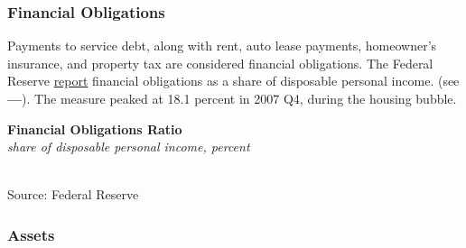 \documentclass{report}
\makeatletter
\newcommand{\tbllink}[1]{\href{https://raw.githubusercontent.com/bdecon/US-chartbook/master/chartbook/data/#1}{\faTable}}
\newcommand*\short[1]{\expandafter\@gobbletwo\number\numexpr#1\relax}
\newcommand{\shdateaxisticks}{
		date coordinates in=x, axis line style={draw=none},
		xmax={2021-06-15},
		max space between ticks=40,	    
		xtick={{1990-01-01}, {1995-01-01}, {2000-01-01}, 
			{2005-01-01}, {2010-01-01}, {2015-01-01}, {2020-01-01}},
		minor xtick={},
		enlarge y limits={0.06}, enlarge x limits={0.01},
		}
\newcommand{\stdline}[4]{\addplot[very thick, no markers, color=#1] 
		table [x=#2, y=#3, col sep=comma] {#4};	}
\newcommand{\rbars}{
		\fill[color=black!10] (axis cs:{1990-07-01},\pgfkeysvalueof{/pgfplots/ymin}) rectangle 
			(axis cs:{1991-03-01}, \pgfkeysvalueof{/pgfplots/ymax});
		\fill[color=black!10] (axis cs:{2007-12-01},\pgfkeysvalueof{/pgfplots/ymin}) rectangle 
			(axis cs:{2009-07-01}, \pgfkeysvalueof{/pgfplots/ymax});
		\fill[color=black!10] (axis cs:{2001-03-01},\pgfkeysvalueof{/pgfplots/ymin}) rectangle 
			(axis cs:{2001-11-01}, \pgfkeysvalueof{/pgfplots/ymax});
		\fill[color=black!10] (axis cs:{2020-02-01},\pgfkeysvalueof{/pgfplots/ymin}) rectangle 
			(axis cs:{2021-06-15}, \pgfkeysvalueof{/pgfplots/ymax});}
\makeatother
\begin{document}
{\subsubsection*{\color{black!70} \seriffont Financial Obligations}
\begin{minipage}{0.3\textwidth}
\small Payments to service debt, along with rent, auto lease payments, homeowner's insurance, and property tax are considered financial obligations. The Federal Reserve \href{https://www.federalreserve.gov/releases/housedebt/default.htm}{report} financial obligations as a share of disposable personal income.   (see {\color{blue!80!black}\textbf{---}}). The measure peaked at 18.1 percent in 2007 Q4, during the housing bubble.
\end{minipage}\hspace{8mm}
\begin{minipage}{0.405\textwidth}
\normalsize \textbf{Financial Obligations Ratio}\\
\footnotesize{\textit{share of disposable personal income, percent}}\\
\hspace*{-2mm} \\
\footnotesize{Source: Federal Reserve} \hfill \tbllink{for.csv} 
\end{minipage}
\newpage
\begin{minipage}{0.76\textwidth}
\subsubsection*{\color{black!70} \seriffont Assets}

\small  

 


\vspace{2mm}


\end{minipage}}
\end{document}
